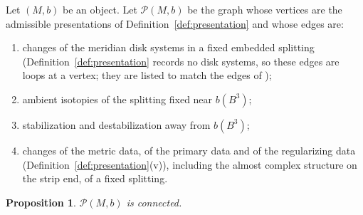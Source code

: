 \documentclass[11pt]{amsart}
\newtheorem{proposition}[theorem]{Proposition}
\theoremstyle{definition}
\theoremstyle{remark}
\theoremstyle{plain}
\numberwithin{equation}{section}
\newcommand{\cP}{\mathcal{P}}
\begin{document}
Let $(M,b)$ be an object. Let $\cP(M,b)$ be the graph whose vertices are
the admissible presentations of Definition~\ref{def:presentation} and whose
edges are:
\begin{enumerate}[label=(P\arabic*)]
\item\label{P:disk} changes of the meridian disk systems in a fixed
  embedded splitting (Definition~\ref{def:presentation} records no disk
  systems, so these edges are loops at a vertex; they are listed to match
  the edges of \cite{JTZ});
\item\label{P:iso} ambient isotopies of the splitting fixed near
  $b(B^3)$;
\item\label{P:stab} stabilization and destabilization away from
  $b(B^3)$;
\item\label{P:model} changes of the metric data, of the primary
  data and of the regularizing data (Definition~\ref{def:presentation}(v)),
  including the almost complex structure on the strip end, of a fixed
  splitting.
\end{enumerate}

\begin{proposition}\label{prop:pres-graph}
$\cP(M,b)$ is connected.
\end{proposition}
\end{document}
